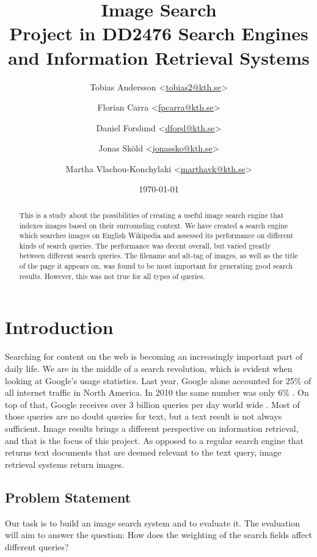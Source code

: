 \documentclass[a4paper]{article}
\title{{\Huge Image Search} \\[1cm] Project in DD2476 Search Engines and Information Retrieval Systems \\[1cm] }
\author{ 
    Tobias Andersson <\href{mailto:tobias2@kth.se}{tobias2@kth.se}> \and
	Florian Carra <\href{mailto:fpcarra@kth.se}{fpcarra@kth.se}> \and
	Daniel Forslund <\href{mailto:dforsl@kth.se}{dforsl@kth.se}> \and
    Jonas Sköld <\href{mailto:jonassko@kth.se}{jonassko@kth.se}> \and
    Martha Vlachou-Konchylaki <\href{mailto:marthavk@kth.se}{marthavk@kth.se}>
}
\date{\today}
\begin{document}
\maketitle
\thispagestyle{empty}

\clearpage

\begin{abstract}
This is a study about the possibilities of creating a useful image search engine that indexes images based on their surrounding context. We have created a search engine which searches images on English Wikipedia and assessed its performance on different kinds of search queries. The performance was decent overall, but varied greatly between different search queries. The filename and alt-tag of images, as well as the title of the page it appears on, was found to be most important for generating good search results. However, this was not true for all types of queries. 
\end{abstract}

\vspace{1cm}

\tableofcontents

\clearpage

\section{Introduction}

Searching for content on the web is becoming an increasingly important part of daily life. We are in the middle of a search revolution, which is evident when looking at Google's usage statistics. Last year, Google alone accounted for 25\% of all internet traffic in North America. In 2010 the same number was only 6\% \cite{google-traffic}. On top of that, Google receives over 3 billion queries per day world wide \cite{google-searches}. Most of those queries are no doubt queries for text, but a text result is not always sufficient. Image results brings a different perspective on information retrieval, and that is the focus of this project. As opposed to a regular search engine that returns text documents that are deemed relevant to the text query, image retrieval systems return images.

\subsection{Problem Statement}
Our task is to build an image search system and to evaluate it. The evaluation will aim to answer the question: How does the weighting of the search fields affect different queries?
\end{document}
